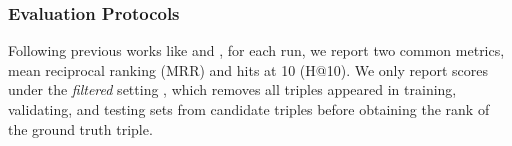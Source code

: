 \documentclass[11pt,a4paper]{article}
\begin{document}
\subsubsection{Evaluation Protocols}
Following previous works like \cite{yang2015embedding} and \cite{trouillon2016complex}, for each run, we report two common metrics, mean reciprocal ranking (MRR) and hits at 10 (H@10). We only report scores under the \emph{filtered} setting \cite{bordes2013translating}, which removes all triples appeared in training, validating, and testing sets from candidate triples before obtaining the rank of the ground truth triple.

\begin{figure}[!t]
\centering
{}
\\

\end{figure}
\end{document}
